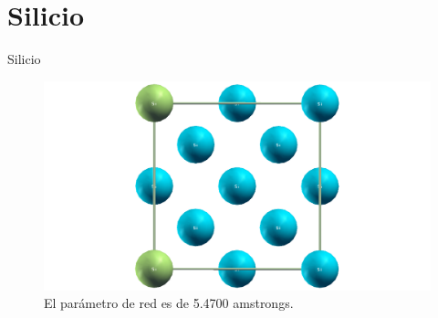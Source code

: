 \section{Silicio}

\begin{frame}{Silicio}
    \begin{figure}[H]
        \centering
        \includegraphics[scale=0.2]{images/longitud_enlace_5_4700_amstrongs.png}
        \caption{El parámetro de red es de 5.4700 amstrongs.}
    \end{figure}
\end{frame}